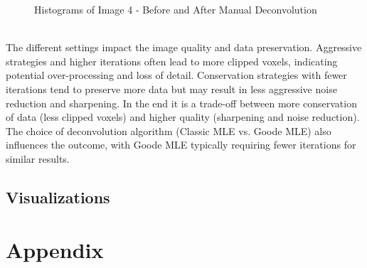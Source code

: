 \documentclass{article}
\begin{document}
\begin{figure}[h!]
\centering
{}
\vspace{5 mm}
\caption{Histograms of Image 4 - Before and After Manual Deconvolution}
\label{fig:manual-deconvolve-image4-histogram}
\end{figure}
\\
The different settings impact the image quality and data preservation. Aggressive strategies and higher iterations often lead to more clipped voxels, indicating potential over-processing and loss of detail. Conservation strategies with fewer iterations tend to preserve more data but may result in less aggressive noise reduction and sharpening. In the end it is a trade-off between more conservation of data (less clipped voxels) and higher quality (sharpening and noise reduction). The choice of deconvolution algorithm (Classic MLE vs. Goode MLE) also influences the outcome, with Goode MLE typically requiring fewer iterations for similar results.

\subsection*{Visualizations}
\clearpage
\section*{Appendix}
\end{document}
